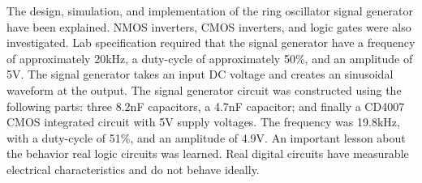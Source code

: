 
The design, simulation, and implementation of the ring oscillator signal generator have been explained. NMOS inverters, CMOS inverters, and logic gates were also investigated. Lab specification required that the signal generator have a frequency of approximately 20kHz, a duty-cycle of approximately 50\%, and an amplitude of 5V. The signal generator takes an input DC voltage and creates an sinusoidal waveform at the output. The signal generator circuit was constructed using the following parts: three 8.2nF capacitors, a 4.7nF capacitor; and finally a CD4007 CMOS integrated circuit with 5V supply voltages. The frequency was 19.8kHz, with a duty-cycle of 51\%, and an amplitude of 4.9V. 
An important lesson about the behavior real logic circuits was learned. Real digital circuits have measurable electrical characteristics and do not behave ideally.



